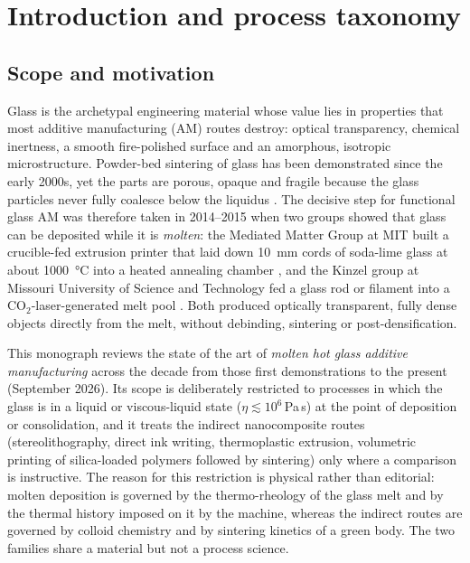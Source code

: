 \section{Introduction and process taxonomy}
\label{sec:intro}

\subsection{Scope and motivation}
Glass is the archetypal engineering material whose value lies in properties that most additive manufacturing (AM) routes destroy: optical transparency, chemical inertness, a smooth fire-polished surface and an amorphous, isotropic microstructure. Powder-bed sintering of glass has been demonstrated since the early 2000s, yet the parts are porous, opaque and fragile because the glass particles never fully coalesce below the liquidus \citep{klein2015,fateri2015,datsiou2021}. The decisive step for functional glass AM was therefore taken in 2014--2015 when two groups showed that glass can be deposited while it is \emph{molten}: the Mediated Matter Group at MIT built a crucible-fed extrusion printer that laid down \SI{10}{mm} cords of soda-lime glass at about \SI{1000}{\celsius} into a heated annealing chamber \citep{klein2015}, and the Kinzel group at Missouri University of Science and Technology fed a glass rod or filament into a CO$_2$-laser-generated melt pool \citep{luo2014jmse,luo2017sodalime}. Both produced optically transparent, fully dense objects directly from the melt, without debinding, sintering or post-densification.

This monograph reviews the state of the art of \emph{molten hot glass additive manufacturing} across the decade from those first demonstrations to the present (September 2026). Its scope is deliberately restricted to processes in which the glass is in a liquid or viscous-liquid state (\(\eta \lesssim 10^{6}\,\)Pa\,s) at the point of deposition or consolidation, and it treats the indirect nanocomposite routes (stereolithography, direct ink writing, thermoplastic extrusion, volumetric printing of silica-loaded polymers followed by sintering) only where a comparison is instructive. The reason for this restriction is physical rather than editorial: molten deposition is governed by the thermo-rheology of the glass melt and by the thermal history imposed on it by the machine, whereas the indirect routes are governed by colloid chemistry and by sintering kinetics of a green body. The two families share a material but not a process science.

